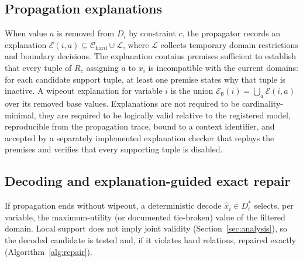 \documentclass[pdflatex,sn-mathphys-num,iicol,oneside]{sn-jnl}
\begin{document}
\subsection{Propagation explanations}
\label{sec:explanations}

When value $a$ is removed from $D_i$ by constraint $c$, the propagator
records an explanation
$\mathcal{E}(i,a)\subseteq\mathcal{C}_{\mathrm{hard}}\cup\mathcal{L}$,
where $\mathcal{L}$ collects temporary domain restrictions and
boundary decisions. The explanation contains premises sufficient to
establish that every tuple of $R_c$ assigning $a$ to $x_i$ is
incompatible with the current domains: for each candidate support
tuple, at least one premise states why that tuple is inactive. A
wipeout explanation for variable $i$ is the union
$\mathcal{E}_{\emptyset}(i)=\bigcup_{a}\mathcal{E}(i,a)$ over its
removed base values. Explanations are not required to be
cardinality-minimal, they are required to be logically valid relative
to the registered model, reproducible from the propagation trace,
bound to a context identifier, and accepted by a separately
implemented explanation checker that replays the premises and verifies
that every supporting tuple is disabled.

\subsection{Decoding and explanation-guided exact repair}
\label{sec:repair}

If propagation ends without wipeout, a deterministic decode
$\widehat{x}_i\in D_i^{*}$ selects, per variable, the
maximum-utility (or documented tie-broken) value of the filtered
domain. Local support does not imply joint validity
(Section~\ref{sec:analysis}), so the decoded candidate is tested and,
if it violates hard relations, repaired exactly
(Algorithm~\ref{alg:repair}).
\end{document}
